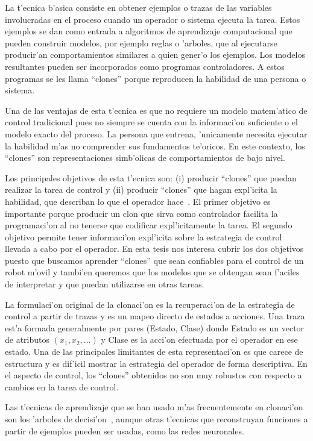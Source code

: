 \documentclass[11pt]{article}
\begin{document}
La t'ecnica b'asica consiste en obtener ejemplos o trazas de las variables involucradas en el proceso cuando un operador o sistema ejecuta la tarea. Estos ejemplos se dan como entrada a algoritmos de aprendizaje computacional que pueden construir modelos, por ejemplo reglas o 'arboles, que al ejecutarse producir'an comportamientos similares a quien gener'o los ejemplos. Los modelos resultantes pueden ser incorporados como programas controladores. A estos programas se les llama ``clones'' porque reproducen la habilidad de una persona o sistema.

Una de las ventajas de esta t'ecnica es que no requiere un modelo matem'atico de control tradicional pues no siempre se cuenta con la informaci'on suficiente o el modelo exacto del proceso. La persona que entrena, 'unicamente necesita ejecutar la habilidad m'as no comprender sus fundamentos te'oricos. En este contexto, los ``clones'' son representaciones simb'olicas de comportamientos de bajo nivel. 

Los principales objetivos de esta t'ecnica son: (i) producir ``clones'' que puedan realizar la tarea de control y (ii) producir ``clones'' que hagan expl'icita la habilidad, que describan lo que el operador hace~\cite{modellingskills}. El primer objetivo es importante porque producir un clon que sirva como controlador facilita la programaci'on al no tenerse que codificar expl'icitamente la tarea. El segundo objetivo permite tener informaci'on expl'icita sobre la estrategia de control llevada a cabo por el operador. En esta tesis nos interesa cubrir los dos objetivos puesto que buscamos aprender ``clones'' que sean confiables para el control de un robot m'ovil y tambi'en queremos que los modelos que se obtengan sean f'aciles de interpretar y que puedan utilizarse en otras tareas.  

La formulaci'on original de la \textsf{clonaci'on} es la recuperaci'on de la estrategia de control a partir de trazas y es un mapeo directo de estados a acciones. Una traza est'a formada generalmente por pares (Estado, Clase) donde Estado es un vector de atributos $(x_1,x_2,...)$ y Clase es la acci'on efectuada por el operador en ese estado. Una de las principales limitantes de esta representaci'on es que carece de estructura y es dif'icil mostrar la estrategia del operador de forma descriptiva. En el aspecto de control, los ``clones'' obtenidos no son muy robustos con respecto a cambios en la tarea de control.

Las t'ecnicas de aprendizaje que se han usado m'as frecuentemente en \textsf{clonaci'on} son los \textsf{'arboles de decisi'on}~\cite{quinlan1986}, aunque otras t'ecnicas que reconstruyan funciones a partir de ejemplos pueden ser usadas, como las redes neuronales.
 
\end{document}
